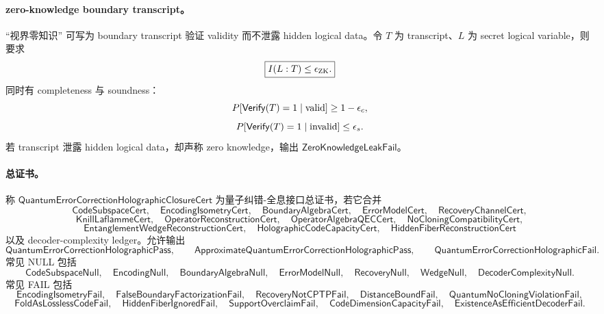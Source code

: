 \paragraph{zero-knowledge boundary transcript。}
``视界零知识'' 可写为 boundary transcript 验证 validity 而不泄露 hidden logical data。令 \(T\) 为 transcript、\(L\) 为 secret logical variable，则要求
\[
\boxed{
I(L:T)\le\epsilon_{\rm ZK}.
}
\]
同时有 completeness 与 soundness：
\[
P[\mathsf{Verify}(T)=1\mid{\rm valid}]\ge1-\epsilon_c,
\]
\[
P[\mathsf{Verify}(T)=1\mid{\rm invalid}]\le\epsilon_s.
\]
若 transcript 泄露 hidden logical data，却声称 zero knowledge，输出 \(\mathsf{ZeroKnowledgeLeakFail}\)。

\paragraph{总证书。}
称 \(\mathsf{QuantumErrorCorrectionHolographicClosureCert}\) 为量子纠错-全息接口总证书，若它合并
\[
\mathsf{CodeSubspaceCert},\quad
\mathsf{EncodingIsometryCert},\quad
\mathsf{BoundaryAlgebraCert},\quad
\mathsf{ErrorModelCert},\quad
\mathsf{RecoveryChannelCert},
\]
\[
\mathsf{KnillLaflammeCert},\quad
\mathsf{OperatorReconstructionCert},\quad
\mathsf{OperatorAlgebraQECCert},\quad
\mathsf{NoCloningCompatibilityCert},
\]
\[
\mathsf{EntanglementWedgeReconstructionCert},\quad
\mathsf{HolographicCodeCapacityCert},\quad
\mathsf{HiddenFiberReconstructionCert}
\]
以及 decoder-complexity ledger。允许输出
\[
\boxed{\mathsf{QuantumErrorCorrectionHolographicPass}},
\qquad
\boxed{\mathsf{ApproximateQuantumErrorCorrectionHolographicPass}},
\qquad
\boxed{\mathsf{QuantumErrorCorrectionHolographicFail}}.
\]
常见 NULL 包括
\[
\mathsf{CodeSubspaceNull},\quad
\mathsf{EncodingNull},\quad
\mathsf{BoundaryAlgebraNull},\quad
\mathsf{ErrorModelNull},\quad
\mathsf{RecoveryNull},\quad
\mathsf{WedgeNull},\quad
\mathsf{DecoderComplexityNull}.
\]
常见 FAIL 包括
\[
\mathsf{EncodingIsometryFail},\quad
\mathsf{FalseBoundaryFactorizationFail},\quad
\mathsf{RecoveryNotCPTPFail},\quad
\mathsf{DistanceBoundFail},\quad
\mathsf{QuantumNoCloningViolationFail},
\]
\[
\mathsf{FoldAsLosslessCodeFail},\quad
\mathsf{HiddenFiberIgnoredFail},\quad
\mathsf{SupportOverclaimFail},\quad
\mathsf{CodeDimensionCapacityFail},\quad
\mathsf{ExistenceAsEfficientDecoderFail}.
\]

